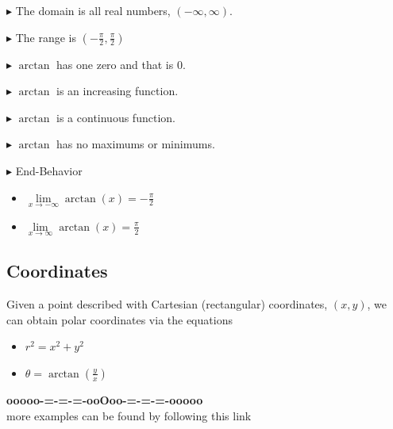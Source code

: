 \documentclass{ximera}
\begin{document}
$\blacktriangleright$ The domain is all real numbers, $(-\infty, \infty)$.


$\blacktriangleright$ The range is $\left( -\frac{\pi}{2}, \frac{\pi}{2} \right)$


$\blacktriangleright$ $\arctan$ has one zero and that is $0$.


$\blacktriangleright$ $\arctan$ is an increasing function.

$\blacktriangleright$ $\arctan$ is a continuous function.

$\blacktriangleright$ $\arctan$ has no maximums or minimums.


$\blacktriangleright$ End-Behavior





\begin{itemize}
  \item $\lim\limits_{x \to -\infty} \arctan(x) = -\frac{\pi}{2}$
  \item $\lim\limits_{x \to \infty} \arctan(x) = \frac{\pi}{2}$
\end{itemize}










\subsection*{Coordinates} 

Given a point described with Cartesian (rectangular) coordinates, $(x, y)$, we can obtain polar coordinates via the equations


\begin{itemize}
\item $r^2 = x^2 + y^2$
\item $\theta = \arctan\left( \frac{y}{x} \right)$
\end{itemize}









\begin{onlineOnly}
\begin{center}
\textbf{\textcolor{green!50!black}{ooooo-=-=-=-ooOoo-=-=-=-ooooo}} \\

more examples can be found by following this link\\ 

\end{center}
\end{onlineOnly}
\end{document}
